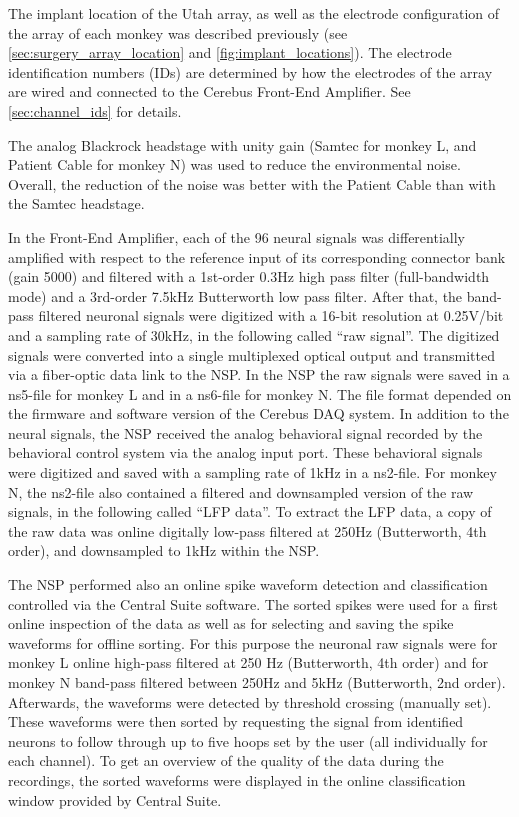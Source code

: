 {The implant location of the Utah array, as well as the electrode configuration of the array of each monkey was described previously (see \cref{sec:surgery_array_location} and \cref{fig:implant_locations}). The electrode identification numbers (IDs) are determined by how the electrodes of the array are wired and connected to the Cerebus Front-End Amplifier. See \ref{sec:channel_ids} for details.

The analog Blackrock headstage with unity gain (Samtec for monkey L, and Patient Cable for monkey N) was used to reduce the environmental noise. Overall, the reduction of the noise was better with the Patient Cable than with the Samtec headstage.

In the Front-End Amplifier, each of the 96 neural signals was differentially amplified with respect to the reference input of its corresponding connector bank (gain 5000) and filtered with a 1st-order 0.3Hz high pass filter (full-bandwidth mode) and a 3rd-order 7.5kHz Butterworth low pass filter. After that, the band-pass filtered neuronal signals were digitized with a 16-bit resolution at 0.25V/bit and a sampling rate of 30kHz, in the following called “raw signal”. The digitized signals were converted into a single multiplexed optical output and transmitted via a fiber-optic data link to the NSP. In the NSP the raw signals were saved in a ns5-file for monkey L and in a ns6-file for monkey N. The file format depended on the firmware and software version of the Cerebus DAQ system. In addition to the neural signals, the NSP received the analog behavioral signal recorded by the behavioral control system via the analog input port. These behavioral signals were digitized and saved with a sampling rate of 1kHz in a ns2-file. For monkey N, the ns2-file also contained a filtered and downsampled version of the raw signals, in the following called “LFP data”. To extract the LFP data, a copy of the raw data was online digitally low-pass filtered at 250Hz (Butterworth, 4th order), and downsampled to 1kHz within the NSP.

The NSP performed also an online spike waveform detection and classification controlled via the Central Suite software. The sorted spikes were used for a first online inspection of the data as well as for selecting and saving the spike waveforms for offline sorting. For this purpose the neuronal raw signals were for monkey L online high-pass filtered at 250 Hz (Butterworth, 4th order) and for monkey N band-pass filtered between 250Hz and 5kHz (Butterworth, 2nd order). Afterwards, the waveforms were detected by threshold crossing (manually set). These waveforms were then sorted by requesting the signal from identified neurons to follow through up to five hoops set by the user (all individually for each channel). To get an overview of the quality of the data during the recordings, the sorted waveforms were displayed in the online classification window provided by Central Suite.

}
